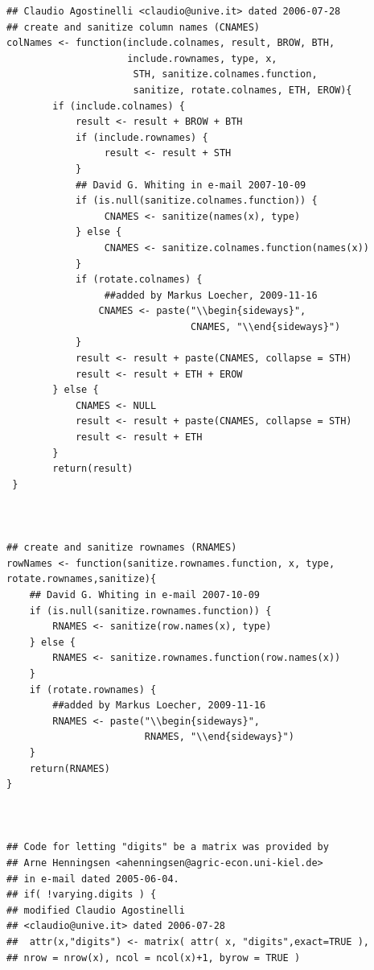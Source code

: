 \documentclass{memoir}\usepackage[]{graphicx}\usepackage[]{color}
\begin{document}
\begin{lstlisting}
## Claudio Agostinelli <claudio@unive.it> dated 2006-07-28
## create and sanitize column names (CNAMES)
colNames <- function(include.colnames, result, BROW, BTH, 
                     include.rownames, type, x,
                      STH, sanitize.colnames.function, 
                      sanitize, rotate.colnames, ETH, EROW){
        if (include.colnames) {
            result <- result + BROW + BTH
            if (include.rownames) {
                 result <- result + STH
            }
            ## David G. Whiting in e-mail 2007-10-09
            if (is.null(sanitize.colnames.function)) {
                 CNAMES <- sanitize(names(x), type)
            } else {
                 CNAMES <- sanitize.colnames.function(names(x))
            }
            if (rotate.colnames) {
                 ##added by Markus Loecher, 2009-11-16
                CNAMES <- paste("\\begin{sideways}", 
                                CNAMES, "\\end{sideways}")
            }
            result <- result + paste(CNAMES, collapse = STH)
            result <- result + ETH + EROW
        } else {
            CNAMES <- NULL
            result <- result + paste(CNAMES, collapse = STH)
            result <- result + ETH 
        }
        return(result)
 }



## create and sanitize rownames (RNAMES)
rowNames <- function(sanitize.rownames.function, x, type, rotate.rownames,sanitize){
    ## David G. Whiting in e-mail 2007-10-09
    if (is.null(sanitize.rownames.function)) {
        RNAMES <- sanitize(row.names(x), type)
    } else {
        RNAMES <- sanitize.rownames.function(row.names(x))
    }
    if (rotate.rownames) {
        ##added by Markus Loecher, 2009-11-16
        RNAMES <- paste("\\begin{sideways}", 
                        RNAMES, "\\end{sideways}")
    }
    return(RNAMES)
}



## Code for letting "digits" be a matrix was provided by
## Arne Henningsen <ahenningsen@agric-econ.uni-kiel.de>
## in e-mail dated 2005-06-04.
## if( !varying.digits ) {
## modified Claudio Agostinelli 
## <claudio@unive.it> dated 2006-07-28
##  attr(x,"digits") <- matrix( attr( x, "digits",exact=TRUE ),
## nrow = nrow(x), ncol = ncol(x)+1, byrow = TRUE )


\end{lstlisting}
\end{document}
